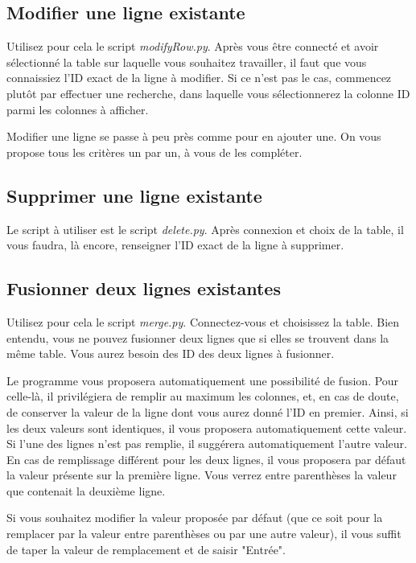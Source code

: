 \documentclass[12pt,a4paper]{article}
\begin{document}
\bigskip
\subsection{Modifier une ligne existante}
    
    Utilisez pour cela le script \emph{modifyRow.py}.
    Après vous être connecté et avoir sélectionné la table sur laquelle vous souhaitez travailler,
    il faut que vous connaissiez l'ID exact de la ligne à modifier. Si ce n'est pas le cas,
    commencez plutôt par effectuer une recherche, dans laquelle vous sélectionnerez la colonne ID
    parmi les colonnes à afficher.

    Modifier une ligne se passe à peu près comme pour en ajouter une. On vous propose tous les critères
    un par un, à vous de les compléter.


\bigskip
\subsection{Supprimer une ligne existante}

    Le script à utiliser est le script \emph{delete.py}.
    Après connexion et choix de la table, il vous faudra, là encore, renseigner l'ID exact de la ligne
    à supprimer.


\bigskip
\subsection{Fusionner deux lignes existantes}

    Utilisez pour cela le script \emph{merge.py}.
    Connectez-vous et choisissez la table. Bien entendu, vous ne pouvez fusionner deux lignes
    que si elles se trouvent dans la même table. Vous aurez besoin des ID des deux lignes à fusionner.
    
    Le programme vous proposera automatiquement une possibilité de fusion. Pour celle-là, il privilégiera
    de remplir au maximum les colonnes, et, en cas de doute, de conserver la valeur de la ligne dont vous
    aurez donné l'ID en premier.
    Ainsi, si les deux valeurs sont identiques, il vous proposera automatiquement cette valeur. Si l'une
    des lignes n'est pas remplie, il suggérera automatiquement l'autre valeur. En cas de remplissage différent
    pour les deux lignes, il vous proposera par défaut la valeur présente sur la première ligne. Vous verrez
    entre parenthèses la valeur que contenait la deuxième ligne.

    Si vous souhaitez modifier la valeur proposée par défaut (que ce soit pour la remplacer par la valeur
    entre parenthèses ou par une autre valeur), il vous suffit de taper la valeur de remplacement et de saisir
    "Entrée".
\end{document}
